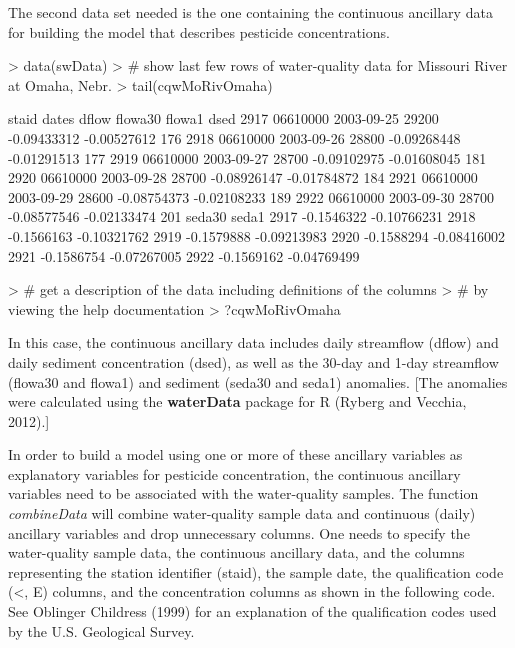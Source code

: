 \documentclass[11pt]{article}
\begin{document}
The second data set needed is the one containing the continuous ancillary data for building the model that describes pesticide concentrations.  
\vspace{5 mm}

\begin{Schunk}
\begin{Sinput}
> data(swData)
> # show last few rows of water-quality data for Missouri River at Omaha, Nebr.
> tail(cqwMoRivOmaha)
\end{Sinput}
\begin{Soutput}
        staid      dates dflow     flowa30      flowa1 dsed
2917 06610000 2003-09-25 29200 -0.09433312 -0.00527612  176
2918 06610000 2003-09-26 28800 -0.09268448 -0.01291513  177
2919 06610000 2003-09-27 28700 -0.09102975 -0.01608045  181
2920 06610000 2003-09-28 28700 -0.08926147 -0.01784872  184
2921 06610000 2003-09-29 28600 -0.08754373 -0.02108233  189
2922 06610000 2003-09-30 28700 -0.08577546 -0.02133474  201
         seda30       seda1
2917 -0.1546322 -0.10766231
2918 -0.1566163 -0.10321762
2919 -0.1579888 -0.09213983
2920 -0.1588294 -0.08416002
2921 -0.1586754 -0.07267005
2922 -0.1569162 -0.04769499
\end{Soutput}
\begin{Sinput}
> # get a description of the data including definitions of the columns
> # by viewing the help documentation
> ?cqwMoRivOmaha
\end{Sinput}
\end{Schunk}
\vspace{5 mm}

In this case, the continuous ancillary data includes daily streamflow (dflow) and daily sediment concentration (dsed), as well as the 30-day and 1-day streamflow (flowa30 and flowa1) and sediment (seda30 and seda1) anomalies.  [The anomalies were calculated using the \textbf{waterData} package for R (Ryberg and Vecchia, 2012).]

In order to build a model using one or more of these ancillary variables as explanatory variables for pesticide concentration, the continuous ancillary variables need to be associated with the water-quality samples.  The function \textit{combineData} will combine water-quality sample data and continuous (daily) ancillary variables and drop unnecessary columns.  One needs to specify the water-quality sample data, the continuous ancillary data, and the columns representing the station identifier (staid), the sample date, the qualification code (<, E) columns, and the concentration columns as shown in the following code.  See Oblinger Childress (1999) for an explanation of the qualification codes used by the U.S. Geological Survey.
\vspace{5 mm}
\end{document}
